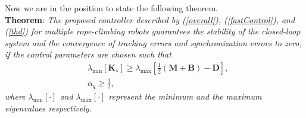 \documentclass[letterpaper, 10 pt, conference]{ieeeconf}
\begin{document}
%

Now we are in the position to state the following theorem.\\
\textbf{Theorem}: {\em The proposed controller
described by (\ref{overall}), (\ref{fastControl}), and (\ref{thd})
for multiple rope-climbing robots guarantees the stability of the closed-loop system and the convergence of tracking errors and synchronization errors to zero, if the control parameters are chosen such that
\begin{eqnarray}
&\lambda_{\min}[\bm K_s]\geq\lambda_{\max}[\frac{1}{2}(\bm M+\bm B)-\bm D],\label{con1}\\
&\alpha_q\geq\frac{1}{2},\label{con2}
\end{eqnarray}
where $\lambda_{\min}[\cdot]$ and $\lambda_{\max}[\cdot]$ represent the minimum and the maximum eigenvalues respectively.
}
\end{document}
